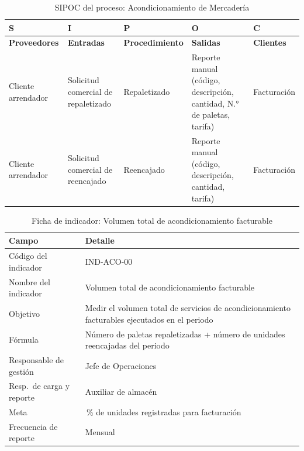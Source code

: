\documentclass[11pt, a4paper, oneside]{report}
\newcommand{\procedimiento}[2]{%
  \vspace{10pt}%
  \noindent{\color{upeu_mid}\bfseries\normalsize #1)\ #2}%
  \par\vspace{4pt}%
}
\newcommand{\fichaIndicador}[8]{%
  \begin{table}[H]
  \centering\small
  \renewcommand{\arraystretch}{1.25}
  \setlength{\tabcolsep}{6pt}
  \begin{tabularx}{\textwidth}{|>{\raggedright\arraybackslash}p{0.28\textwidth}|>{\raggedright\arraybackslash}X|}
  \hline
  \rowcolor{upeu_mid}
  \color{white}\bfseries Campo & \color{white}\bfseries Detalle \\ \hline
  \rowcolor{gray!10}
  Código del indicador & #1 \\ \hline
  Nombre del indicador & #2 \\ \hline
  \rowcolor{gray!10}
  Objetivo & #3 \\ \hline
  Fórmula & #4 \\ \hline
  \rowcolor{gray!10}
  Responsable de gestión & #5 \\ \hline
  Resp.\ de carga y reporte & #6 \\ \hline
  \rowcolor{gray!10}
  Meta & #7 \\ \hline
  Frecuencia de reporte & #8 \\ \hline
  \end{tabularx}
  \caption{Ficha de indicador: #2}
  \end{table}%
}
\begin{document}
\begin{table}[H]
\centering\small
\renewcommand{\arraystretch}{1.3}
\setlength{\tabcolsep}{4pt}
\begin{tabularx}{\textwidth}{|>{\raggedright\arraybackslash}p{}|>{\raggedright\arraybackslash}p{}|>{\raggedright\arraybackslash}p{}|>{\raggedright\arraybackslash}p{}|>{\raggedright\arraybackslash}X|}
\hline
\rowcolor{upeu_dark}
\color{white}\bfseries S & \color{white}\bfseries I & \color{white}\bfseries P & \color{white}\bfseries O & \color{white}\bfseries C \\ \hline
\rowcolor{upeu_light}
\bfseries Proveedores & \bfseries Entradas & \bfseries Procedimiento & \bfseries Salidas & \bfseries Clientes \\ \hline
Cliente arrendador &
Solicitud comercial de repaletizado &
Repaletizado &
Reporte manual (código, descripción, cantidad, N.° de paletas, tarifa) &
Facturación \\ \hline
\rowcolor{gray!10}
Cliente arrendador &
Solicitud comercial de reencajado &
Reencajado &
Reporte manual (código, descripción, cantidad, tarifa) &
Facturación \\ \hline
\end{tabularx}
\caption{SIPOC del proceso: Acondicionamiento de Mercadería}
\end{table}

\fichaIndicador
  {IND-ACO-00}
  {Volumen total de acondicionamiento facturable}
  {Medir el volumen total de servicios de acondicionamiento facturables ejecutados en el periodo}
  {Número de paletas repaletizadas + número de unidades reencajadas del periodo}
  {Jefe de Operaciones}
  {Auxiliar de almacén}
  {100\,\% de unidades registradas para facturación}
  {Mensual}

\procedimiento{a}{Repaletizado}
\end{document}
